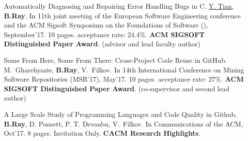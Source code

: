 \begin{cventries}


{
  \begin{cvenumerate}
        \item 
        \paper
        {Automatically Diagnosing and Repairing Error Handling Bugs in C.}
        {\underline{Y. Tian}, \textbf{B.Ray}.}
        {In 11th joint meeting of the European Software Engineering conference and the ACM Sigsoft Symposium on the Foundations of Software (), September’17.}
        {10 pages.}
        {acceptance rate: 24.4\%.}
        {\textbf{\color{awesome}ACM SIGSOFT Distinguished Paper Award}.}
        {
        (advisor and lead faculty author)
        }
        \item 
        \paper
        {Some From Here, Some From There: Cross-Project Code Reuse in GitHub.}
        {M.~Gharehyazie, \textbf{B.Ray}, V.~Filkov.}
        {In 14th International Conference on Mining Software Repositories (MSR’17), May’17.}
        {10 pages.}
        {acceptance rate: 27\%.}
        {\textbf{\color{awesome}ACM SIGSOFT Distinguished Paper Award}.}
        {
        (co-supervisor and second lead author)
        }
        \item 
        \paper
        {A Large Scale Study of Programming Languages and Code Quality in Github.}
        {\textbf{B.Ray}, D. Posnett, P. T. Devanbu, V.~Filkov.}
        {In Communications of the ACM, Oct’17.}
        {8 pages.}
        {Invitation Only.}
        {\textbf{\color{awesome}CACM Research Highlights}.}
        {
        }
    \end{cvenumerate}
}












\end{cventries}
    

